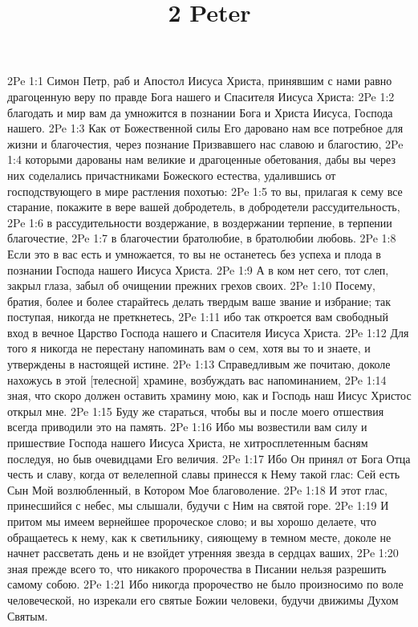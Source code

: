 

\title{2 Peter}

2Pe 1:1  Симон Петр, раб и Апостол Иисуса Христа, принявшим с нами равно драгоценную веру по правде Бога нашего и Спасителя Иисуса Христа:
2Pe 1:2  благодать и мир вам да умножится в познании Бога и Христа Иисуса, Господа нашего.
2Pe 1:3  Как от Божественной силы Его даровано нам все потребное для жизни и благочестия, через познание Призвавшего нас славою и благостию,
2Pe 1:4  которыми дарованы нам великие и драгоценные обетования, дабы вы через них соделались причастниками Божеского естества, удалившись от господствующего в мире растления похотью:
2Pe 1:5  то вы, прилагая к сему все старание, покажите в вере вашей добродетель, в добродетели рассудительность,
2Pe 1:6  в рассудительности воздержание, в воздержании терпение, в терпении благочестие,
2Pe 1:7  в благочестии братолюбие, в братолюбии любовь.
2Pe 1:8  Если это в вас есть и умножается, то вы не останетесь без успеха и плода в познании Господа нашего Иисуса Христа.
2Pe 1:9  А в ком нет сего, тот слеп, закрыл глаза, забыл об очищении прежних грехов своих.
2Pe 1:10  Посему, братия, более и более старайтесь делать твердым ваше звание и избрание; так поступая, никогда не преткнетесь,
2Pe 1:11  ибо так откроется вам свободный вход в вечное Царство Господа нашего и Спасителя Иисуса Христа.
2Pe 1:12  Для того я никогда не перестану напоминать вам о сем, хотя вы то и знаете, и утверждены в настоящей истине.
2Pe 1:13  Справедливым же почитаю, доколе нахожусь в этой [телесной] храмине, возбуждать вас напоминанием,
2Pe 1:14  зная, что скоро должен оставить храмину мою, как и Господь наш Иисус Христос открыл мне.
2Pe 1:15  Буду же стараться, чтобы вы и после моего отшествия всегда приводили это на память.
2Pe 1:16  Ибо мы возвестили вам силу и пришествие Господа нашего Иисуса Христа, не хитросплетенным басням последуя, но быв очевидцами Его величия.
2Pe 1:17  Ибо Он принял от Бога Отца честь и славу, когда от велелепной славы принесся к Нему такой глас: Сей есть Сын Мой возлюбленный, в Котором Мое благоволение.
2Pe 1:18  И этот глас, принесшийся с небес, мы слышали, будучи с Ним на святой горе.
2Pe 1:19  И притом мы имеем вернейшее пророческое слово; и вы хорошо делаете, что обращаетесь к нему, как к светильнику, сияющему в темном месте, доколе не начнет рассветать день и не взойдет утренняя звезда в сердцах ваших,
2Pe 1:20  зная прежде всего то, что никакого пророчества в Писании нельзя разрешить самому собою.
2Pe 1:21  Ибо никогда пророчество не было произносимо по воле человеческой, но изрекали его святые Божии человеки, будучи движимы Духом Святым.
